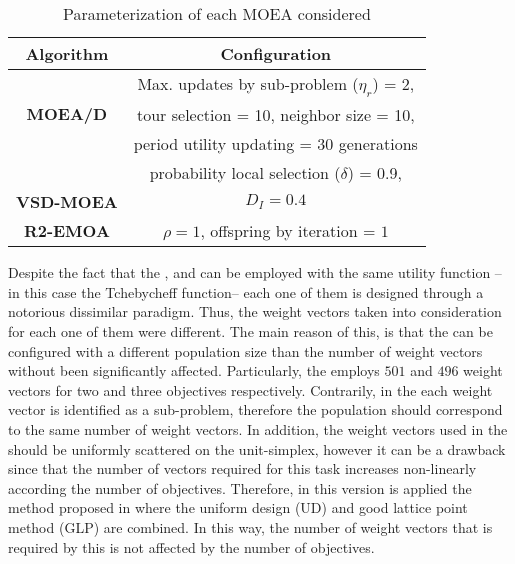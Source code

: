 \begin{table}[t]
\centering
\caption{Parameterization of each MOEA considered}
\label{tab:Parametrization}
\begin{tabular}{c|c}
\hline
\textbf{Algorithm} & \textbf{Configuration} \\ \hline
\multirow{3}{*}{\textbf{MOEA/D}} &Max. updates by sub-problem ($\eta_r$) = 2, \\
 & tour selection = 10,   neighbor size = 10, \\
 & period utility updating = 30 generations \\ 
 & probability local selection ($\delta$) = 0.9,\\ \hline
\textbf{VSD-MOEA} & $D_I=0.4$ \\ \hline
\textbf{R2-EMOA} & $\rho=1$, offspring by iteration = $1$ \\ \hline
\end{tabular}
\end{table}


Despite the fact that the \MOEAD{}, and \RMOEA{} can be employed with the same utility function --in this case the Tchebycheff function-- each one of them is designed through a notorious dissimilar paradigm.
%
Thus, the weight vectors taken into consideration for each one of them were different.
%
The main reason of this, is that the \RMOEA{} can be configured with a different population size than the number of weight vectors without been significantly affected.
%
Particularly, the \RMOEA{} employs $501$ and $496$ weight vectors for two and three objectives respectively.
%
Contrarily, in the \MOEAD{} each weight vector is identified as a sub-problem, therefore the population should correspond to the same number of weight vectors.
%
In addition, the weight vectors used in the \MOEAD{} should be uniformly scattered on the unit-simplex, however it can be a drawback since that the number of vectors required for this task increases non-linearly according the number of objectives.
%
Therefore, in this version is applied the method proposed in \cite{Joel:MOEAD_Uniform_Design, Joel:Kuhn_Munkres} where the uniform design (UD) \cite{Joel:Uniform_Design} and good lattice point method (GLP) are combined.
%
In this way, the number of weight vectors that is required by this \MOEA{} is not affected by the number of objectives.


